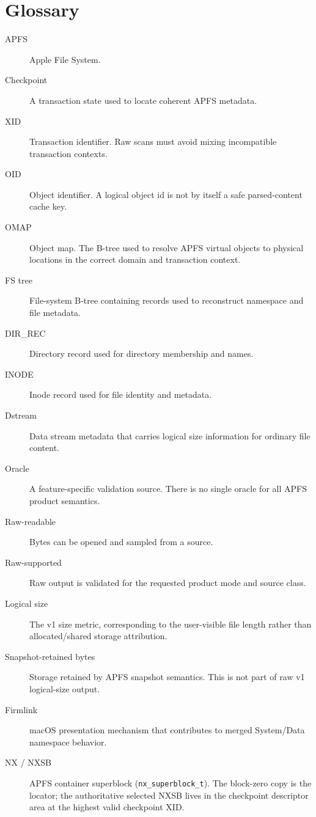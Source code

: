 \chapter{Glossary}

\begin{description}
  \item[APFS] Apple File System.
  \item[Checkpoint] A transaction state used to locate coherent APFS metadata.
  \item[XID] Transaction identifier. Raw scans must avoid mixing incompatible
  transaction contexts.
  \item[OID] Object identifier. A logical object id is not by itself a safe
  parsed-content cache key.
  \item[OMAP] Object map. The B-tree used to resolve APFS virtual objects to
  physical locations in the correct domain and transaction context.
  \item[FS tree] File-system B-tree containing records used to reconstruct
  namespace and file metadata.
  \item[DIR\_REC] Directory record used for directory membership and names.
  \item[INODE] Inode record used for file identity and metadata.
  \item[Dstream] Data stream metadata that carries logical size information for
  ordinary file content.
  \item[Oracle] A feature-specific validation source. There is no single oracle
  for all APFS product semantics.
  \item[Raw-readable] Bytes can be opened and sampled from a source.
  \item[Raw-supported] Raw output is validated for the requested product mode and
  source class.
  \item[Logical size] The v1 size metric, corresponding to the user-visible file
  length rather than allocated/shared storage attribution.
  \item[Snapshot-retained bytes] Storage retained by APFS snapshot semantics.
  This is not part of raw v1 logical-size output.
  \item[Firmlink] macOS presentation mechanism that contributes to merged
  System/Data namespace behavior.
  \item[NX / NXSB] APFS container superblock (\texttt{nx\_superblock\_t}). The
  block-zero copy is the locator; the authoritative selected NXSB lives in the
  checkpoint descriptor area at the highest valid checkpoint XID.

\end{description}
